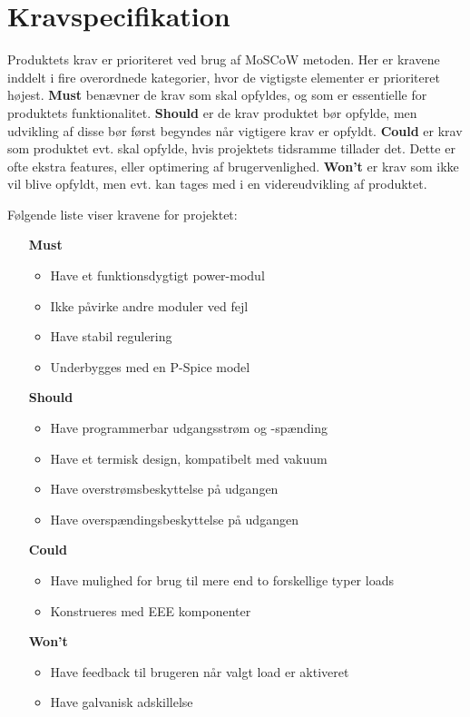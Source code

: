 \chapter{Kravspecifikation}

Produktets krav er prioriteret ved brug af MoSCoW metoden. Her er kravene inddelt i fire overordnede kategorier, hvor de vigtigste elementer er prioriteret højest. \textbf{Must} benævner de krav som skal opfyldes, og som er essentielle for produktets funktionalitet. \textbf{Should} er de krav produktet bør opfylde, men udvikling af disse bør først begyndes når vigtigere krav er opfyldt. \textbf{Could} er krav som produktet evt. skal opfylde, hvis projektets tidsramme tillader det. Dette er ofte ekstra features, eller optimering af brugervenlighed. \textbf{Won't} er krav som ikke vil blive opfyldt, men evt. kan tages med i en videreudvikling af produktet.

\noindent Følgende liste viser kravene for projektet:
\begin{itemize}
	\item[\textbf{Must}]
		\begin{itemize}
			\item Have et funktionsdygtigt power-modul
			\item Ikke påvirke andre moduler ved fejl
			\item Have stabil regulering
			\item Underbygges med en P-Spice model

		\end{itemize}
	\item[\textbf{Should}]
		\begin{itemize}
			\item Have programmerbar udgangsstrøm og -spænding
			\item Have et termisk design, kompatibelt med vakuum
			\item Have overstrømsbeskyttelse på udgangen
			\item Have overspændingsbeskyttelse på udgangen

		\end{itemize}
	\item[\textbf{Could}] 
		\begin{itemize}
			\item Have mulighed for brug til mere end to forskellige typer loads
			\item Konstrueres med EEE komponenter

		\end{itemize}
	\item[\textbf{Won't}]
		\begin{itemize}
			\item Have feedback til brugeren når valgt load er aktiveret
			\item Have galvanisk adskillelse
			
		\end{itemize}
\end{itemize}

